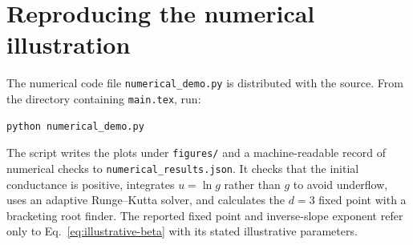 \documentclass[11pt,a4paper]{article}
\numberwithin{equation}{section}
\begin{document}
\section{Reproducing the numerical illustration}

The numerical code file \texttt{numerical\_demo.py} is distributed with the source. From the directory containing \texttt{main.tex}, run:
\begin{lstlisting}[language=bash]
python numerical_demo.py
\end{lstlisting}
The script writes the plots under \texttt{figures/} and a machine-readable record of numerical checks to \texttt{numerical\_results.json}. It checks that the initial conductance is positive, integrates $u=\ln g$ rather than $g$ to avoid underflow, uses an adaptive Runge--Kutta solver, and calculates the $d=3$ fixed point with a bracketing root finder. The reported fixed point and inverse-slope exponent refer only to Eq.~\eqref{eq:illustrative-beta} with its stated illustrative parameters.

\clearpage


\end{document}

